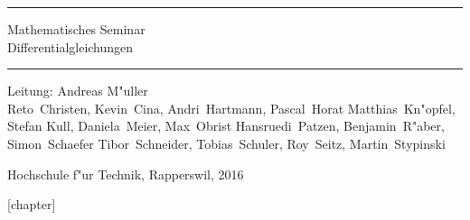\documentclass{book}
\begin{document}
\pagestyle{fancy}
\frontmatter
\newcommand\HRule{\noindent\rule{\linewidth}{1.5pt}}
\begin{titlepage}
\HRule
\vspace*{5pt}
\begin{flushright}
{
\LARGE
Mathematisches Seminar\\
\vspace*{20pt}
\Huge
Differentialgleichungen%
}
\vspace*{5pt}
\end{flushright}
\HRule
\begin{flushright}
\vspace{60pt}
\Large
Leitung: Andreas M"uller\\
\vspace{40pt}
\Large
Reto~Christen,
Kevin~Cina,
Andri~Hartmann,
Pascal~Horat %
Matthias~Kn"opfel,
Stefan Kull,
Daniela~Meier,
Max~Obrist %
Hansruedi~Patzen,
Benjamin~R"aber,
Simon~Schaefer %
Tibor~Schneider,
Tobias~Schuler,
Roy~Seitz,
Martin~Stypinski
\end{flushright}
\begin{center}
Hochschule f"ur Technik, Rapperswil, 2016
\end{center}
\end{titlepage}
\hypersetup{
    linktoc=all,
    linkcolor=blue
}
\newenvironment{beispiele}{
\bgroup\smallskip\parindent0pt\bf Beispiele\egroup

\begin{list}{\arabic{beispiel}.}
  {\usecounter{beispiel}
  \setlength{\labelsep}{5mm}
  \setlength{\rightmargin}{0pt}
}}{\end{list}}
\newenvironment{uebungsaufgaben}{
\begin{list}{\arabic{uebungsaufgabezaehler}.}
  {\usecounter{uebungsaufgabezaehler}
  \setlength{\labelwidth}{2cm}
  \setlength{\leftmargin}{0pt}
  \setlength{\labelsep}{5mm}
  \setlength{\rightmargin}{0pt}
  \setlength{\itemindent}{0pt}
}}{\end{list}\vfill\pagebreak}
\newenvironment{teilaufgaben}{
\begin{enumerate}
\renewcommand{\labelenumi}{\alph{enumi})}
}{\end{enumerate}}
[chapter]
\def\aufgabepath{uebungsaufgaben/}
\def\ainput#1{\aufgabepath/#1}
\def\verbatimainput#1{\expandafter}
\def\aufgabetoplevel#1{%
\expandafter\def\expandafter\inputpath{#1}%
\let\aufgabepath=\inputpath
}
\def\includeagraphics[#1]#2{\expandafter\texttt{[image: \\aufgabepath\#2]}}
\newcommand{\uebungsaufgabe}[1]{%
\refstepcounter{problemcounter}%
\label{#1}%
\bigskip{\parindent0pt\strut}\hbox{\bf\arabic{problemcounter}. }%
\expandafter\def\csname aufgabepath\endcsname{\inputpath/}%
\expandafter
}
\renewcommand\theproblemcounter{\thechapter.\arabic{problemcounter}}
\end{document}
